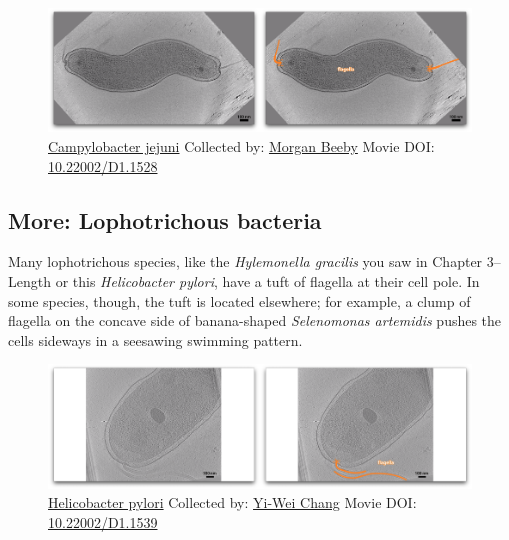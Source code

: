 \documentclass[]{tufte-book}
\begin{document}
\begin{figure}
\includegraphics{movie_stills/6_4} \caption[\protect\hyperlink{tree}{Campylobacter jejuni} Collected by:
\protect\hyperlink{morgan_beeby}{Morgan Beeby} Movie DOI:
\href{https://doi.org/10.22002/D1.1528}{10.22002/D1.1528}]{\protect\hyperlink{tree}{Campylobacter jejuni} Collected by:
\protect\hyperlink{morgan_beeby}{Morgan Beeby} Movie DOI:
\href{https://doi.org/10.22002/D1.1528}{10.22002/D1.1528}}\label{fig:6-4}
\end{figure}

\hypertarget{Lophotrichous_bacteria}{\subsection*{More: Lophotrichous
bacteria}\label{Lophotrichous_bacteria}}

Many lophotrichous species, like the \emph{Hylemonella gracilis} you saw
in Chapter 3--Length or this \emph{Helicobacter pylori}, have a tuft of
flagella at their cell pole. In some species, though, the tuft is
located elsewhere; for example, a clump of flagella on the concave side
of banana-shaped \emph{Selenomonas artemidis} pushes the cells sideways
in a seesawing swimming pattern.





\begin{figure}
\includegraphics{movie_stills/6_4a} \caption[\protect\hyperlink{tree}{Helicobacter pylori} Collected by:
\protect\hyperlink{yi-wei_chang}{Yi-Wei Chang} Movie DOI:
\href{https://doi.org/10.22002/D1.1539}{10.22002/D1.1539}]{\protect\hyperlink{tree}{Helicobacter pylori} Collected by:
\protect\hyperlink{yi-wei_chang}{Yi-Wei Chang} Movie DOI:
\href{https://doi.org/10.22002/D1.1539}{10.22002/D1.1539}}\label{fig:6-4a}
\end{figure}
\end{document}
